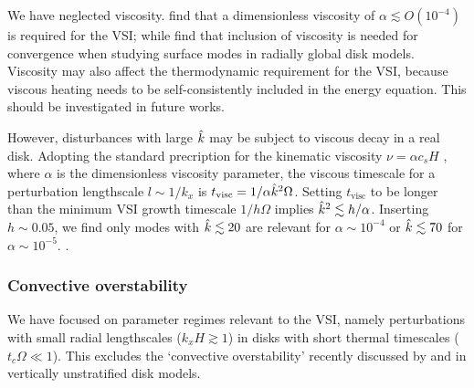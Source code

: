 We have neglected viscosity.  find that a
dimensionless viscosity of $\alpha\lesssim O(10^{-4})$ is required for the
VSI; while  find that inclusion of viscosity is needed for 
convergence when studying surface modes in radially global disk
models. %
Viscosity may also affect the
thermodynamic requirement for the VSI, because viscous heating
needs to be self-consistently included in the energy equation. This
should be investigated in future works.   



However, disturbances with large $\hat{k}$ may be subject to viscous
decay in a real disk. Adopting the standard precription for the
kinematic viscosity $\nu = \alpha c_s H$ \citep{shakura73}, where
$\alpha$ is the dimensionless viscosity parameter, 
the viscous timescale for a perturbation lengthscale 
$l\sim 1/k_x$ is $t_\mathrm{visc} = 1/\alpha\hat{k}^2\Omega $. 
Setting $t_\mathrm{visc}$ to be longer than the
minimum VSI growth timescale $1/h\Omega$ implies 
$\hat{k}^2\lesssim h/\alpha$. Inserting $h \sim 0.05$,
we find only modes with $\hat{k}\lesssim 20$ are relevant for
$\alpha\sim 10^{-4}$ or $\hat{k}\lesssim 70$ for $\alpha\sim
10^{-5}$. .






\subsubsection{Convective overstability}
We have focused on parameter regimes relevant to the VSI,
namely perturbations with small radial lengthscales 
($k_xH\gtrsim 1$) in disks with short thermal timescales
($t_c\Omega\ll 1$). This excludes the `convective overstability'
recently discussed by \cite{klahr14} and \cite{lyra14} in vertically
unstratified disk models.   

